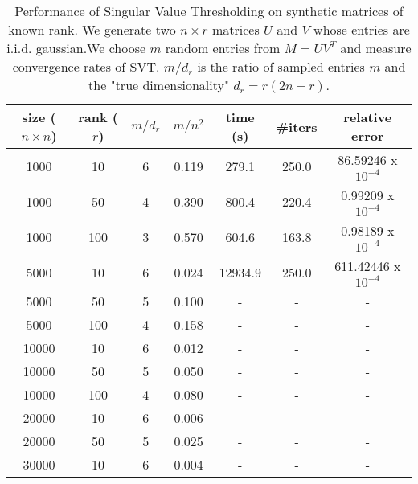 \begin{table}[H!]
\centering
\begin{tabular}{|c|c|c|c|c|c|c|}
\hline
size ($n \times n$) & rank ($r$) & $m/d_r$ & $m/n^2$ & time (s) & \#iters & relative error \\
\hline
1000 & 10 & 6 & 0.119 & 279.1 & 250.0 & 86.59246 x $10^{-4}$ \\
\hline
1000 & 50 & 4 & 0.390 & 800.4 & 220.4 & 0.99209 x $10^{-4}$ \\
\hline
1000 & 100 & 3 & 0.570 & 604.6 & 163.8 & 0.98189 x $10^{-4}$ \\
\hline
5000 & 10 & 6 & 0.024 & 12934.9 & 250.0 & 611.42446 x $10^{-4}$ \\
\hline
5000 & 50 & 5 & 0.100 & - & - & - \\
\hline
5000 & 100 & 4 & 0.158 & - & - & - \\
\hline
10000 & 10 & 6 & 0.012 & - & - & - \\
\hline
10000 & 50 & 5 & 0.050 & - & - & - \\
\hline
10000 & 100 & 4 & 0.080 & - & - & - \\
\hline
20000 & 10 & 6 & 0.006 & - & - & - \\
\hline
20000 & 50 & 5 & 0.025 & - & - & - \\
\hline
30000 & 10 & 6 & 0.004 & - & - & - \\
\hline
\end{tabular}
\caption{Performance of Singular Value Thresholding on synthetic matrices of known rank. We generate two $n\times r$ matrices $U$ and $V$ whose entries are i.i.d. gaussian.We choose $m$ random entries from $M = U V^T$ and measure convergence rates of SVT. $m/d_r$ is the ratio of sampled entries $m$ and the "true dimensionality" $d_r = r(2n-r)$.}
\label{table:svt_synth_1}
\end{table}
